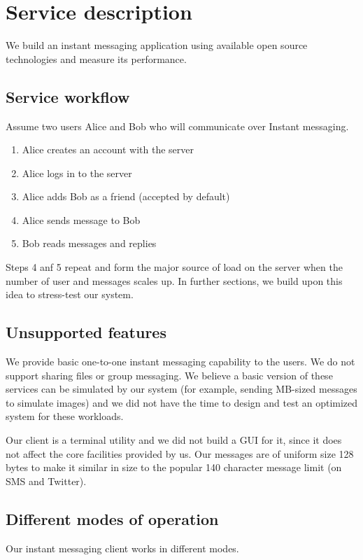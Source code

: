 \documentclass[a4paper, twocolumn]{article}
\begin{document}
\section{Service description}
We build an instant messaging application using available open source technologies and measure its performance. 

\subsection{Service workflow}
Assume two users Alice and Bob who will communicate over Instant messaging. 
\begin{enumerate}
\item Alice creates an account with the server 
\item Alice logs in to the server
\item Alice adds Bob as a friend (accepted by default)
\item Alice sends message to Bob
\item Bob reads messages and replies
\end{enumerate}
Steps 4 anf 5 repeat and form the major source of load on the server when the number of user and messages scales up. In further sections, we build upon this idea to stress-test our system. 

\subsection{Unsupported features}
We provide basic one-to-one instant messaging capability to the users. We do not support sharing files or group messaging. We believe a basic version of these services can be simulated by our system (for example, sending MB-sized messages to simulate images) and we did not have the time to design and test an optimized system for these workloads. 

Our client is a terminal utility and we did not build a GUI for it, since it does not affect the core facilities provided by us. Our messages are of uniform size 128 bytes to make it similar in size to the popular 140 character message limit (on SMS and Twitter). 

\subsection{Different modes of operation}
Our instant messaging client works in different modes.
\end{document}
